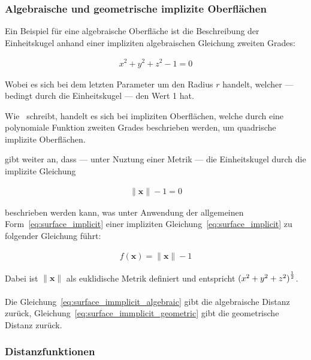 \subsubsection{Algebraische und geometrische implizite Oberflächen}
\label{ssubsec:implicit_surfaces_algebraic_geometric}

Ein Beispiel für eine algebraische Oberfläche ist die Beschreibung der
Einheitskugel anhand einer impliziten algebraischen Gleichung zweiten Grades:

\begin{gather} \label{eq:surface_immplicit_algebraic}
    x^{2} + y^{2} + z^{2} - 1 = 0
\end{gather}

Wobei es sich bei dem letzten Parameter um den Radius $r$ handelt, welcher ---
bedingt durch die Einheitskugel --- den Wert 1 hat.

Wie~\cite{division_introduction_1996} schreibt, handelt es sich bei impliziten
Oberflächen, welche durch eine polynomiale Funktion zweiten Grades beschrieben
werden, um quadrische implizite Oberflächen.

\cite{hart_sphere_1994} gibt weiter an, dass --- unter Nuztung einer Metrik ---
die Einheitskugel durch die implizite Gleichung

\begin{gather} \label{eq:surface_immplicit_geometric}
    \|\bm{x}\| - 1 = 0
\end{gather}

beschrieben werden kann, was unter Anwendung der allgemeinen
Form~\ref{eq:surface_implicit} einer impliziten
Gleichung~\ref{eq:surface_implicit} zu folgender Gleichung führt:

\begin{gather}\label{eq:surface_implicit_sphere}
    f(\bm{x}) = \|\bm{x}\| - 1
\end{gather}


Dabei ist $\|\bm{x}\|$ als euklidische Metrik definiert und entspricht ${(x^{2} + y^{2} + z^{2})}^{1 \over 2}$.\\
\\
Die Gleichung~\ref{eq:surface_immplicit_algebraic} gibt die algebraische
Distanz zurück, Gleichung~\ref{eq:surface_immplicit_geometric} gibt die
geometrische Distanz zurück.\\

\subsubsection{Distanzfunktionen}
\label{ssubsec:distance_functions}

